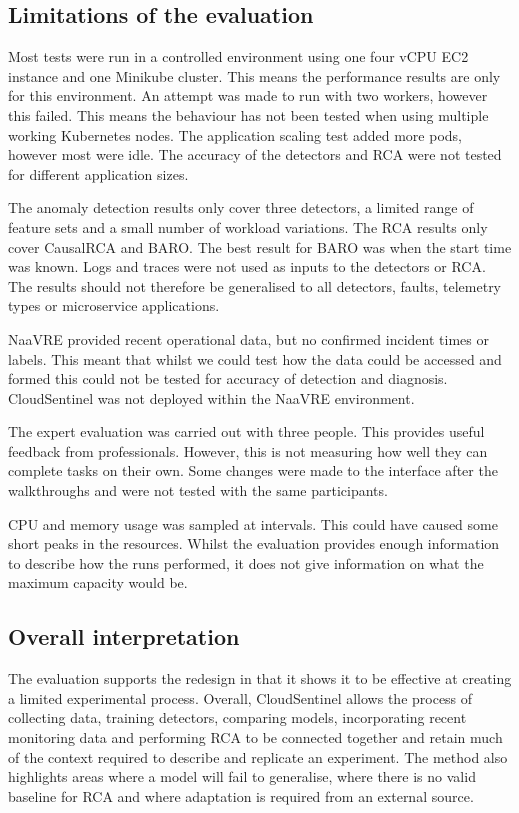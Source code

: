 \subsection{Limitations of the evaluation}

Most tests were run in a controlled environment using one four vCPU EC2 instance and one Minikube cluster. This means the performance results are only for this environment. An attempt was made to run with two workers, however this failed. This means the behaviour has not been tested when using multiple working Kubernetes nodes. The application scaling test added more pods, however most were idle. The accuracy of the detectors and RCA were not tested for different application sizes.

The anomaly detection results only cover three detectors, a limited range of feature sets and a small number of workload variations. The RCA results only cover CausalRCA and BARO. The best result for BARO was when the start time was known. Logs and traces were not used as inputs to the detectors or RCA. The results should not therefore be generalised to all detectors, faults, telemetry types or microservice applications.

NaaVRE provided recent operational data, but no confirmed incident times or labels. This meant that whilst we could test how the data could be accessed and formed this could not be tested for accuracy of detection and diagnosis. CloudSentinel was not deployed within the NaaVRE environment.

The expert evaluation was carried out with three people. This provides useful feedback from professionals. However, this is not measuring how well they can complete tasks on their own. Some changes were made to the interface after the walkthroughs and were not tested with the same participants.

CPU and memory usage was sampled at intervals. This could have caused some short peaks in the resources. Whilst the evaluation provides enough information to describe how the runs performed, it does not give information on what the maximum capacity would be.

\subsection{Overall interpretation}

The evaluation supports the redesign in that it shows it to be effective at creating a limited experimental process. Overall, CloudSentinel allows the process of collecting data, training detectors, comparing models, incorporating recent monitoring data and performing RCA to be connected together and retain much of the context required to describe and replicate an experiment. The method also highlights areas where a model will fail to generalise, where there is no valid baseline for RCA and where adaptation is required from an external source. 


